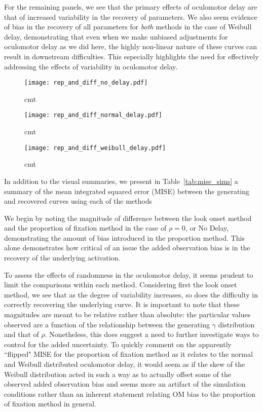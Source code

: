 For the remaining panels, we see that the primary effects of oculomotor delay are that of increased variability in the recovery of parameters. We also seem evidence of bias in the recovery of all parameters for \textit{both} methods in the case of Weibull delay, demonstrating that even when we make unbiased adjustments for oculomotor delay as we did here, the highly non-linear nature of these curves can result in downstream difficulties. This especially highlights the need for effectively addressing the effects of variability in oculomotor delay.

\begin{figure}[H]
\centering
\texttt{[image: rep\_and\_diff\_no\_delay.pdf]}
\caption{cmt}
\label{fig:panel_no_delay}
\end{figure}


\begin{figure}[H]
\centering
\texttt{[image: rep\_and\_diff\_normal\_delay.pdf]}
\caption{cmt}
\label{fig:panel_normal_delay}
\end{figure}



\begin{figure}[H]
\centering
\texttt{[image: rep\_and\_diff\_weibull\_delay.pdf]}
\caption{cmt}
\label{fig:panel_weibull_delay}
\end{figure}



In addition to the visual summaries, we present in Table~\ref{tab:mise_sims} a summary of the mean integrated squared error (MISE) between the generating and recovered curves using each of the methods

We begin by noting the  magnitude of difference between the look onset method and the proportion of fixation method in the case of $\rho = 0$, or No Delay, demonstrating the amount of bias introduced in the proportion method. This alone demonstrates how critical of an issue the added observation bias is in the recovery of the underlying activation.

To assess the effects of randomness in the oculomotor delay, it seems prudent to limit the comparisons within each method. Considering first the look onset method, we see that as the degree of variability increases, so does the difficulty in correctly recovering the underlying curve. It is important to note that these magnitudes are meant to be relative rather than absolute: the particular values observed are a function of the relationship between the generating $\gamma$ distribution and that of $\rho$. Nonetheless, this does suggest a need to further investigate ways to control for the added uncertainty. To quickly comment on the apparently ``flipped" MISE for the proportion of fixation method as it relates to the normal and Weibull distributed oculomotor delay, it would seem as if the skew of the Weibull distribution acted in such a way as to actually offset some of the observed added observation bias and seems more an artifact of the simulation conditions rather than an inherent statement relating OM bias to the proportion of fixation method in general.

